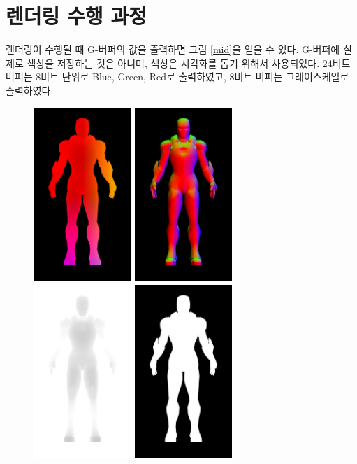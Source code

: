 \documentclass[a4paper,itemph,amsmath,oneside,11pt,openany]{xoblivoir}
\begin{document}
\section{렌더링 수행 과정}
렌더링이 수행될 때 G-버퍼의 값을 출력하면 그림 \ref{mid}을 얻을 수 있다.
G-버퍼에 실제로 색상을 저장하는 것은 아니며, 색상은 시각화를 돕기 위해서 사용되었다.
24비트 버퍼는 8비트 단위로 Blue, Green, Red로 출력하였고,
8비트 버퍼는 그레이스케일로 출력하였다.


\begin{figure}[H]
\centering
\includegraphics[width=37mm]{img/position}
\includegraphics[width=37mm]{img/normal}
\includegraphics[width=37mm]{img/depth}
\includegraphics[width=37mm]{img/mask}

\end{figure}
\end{document}
